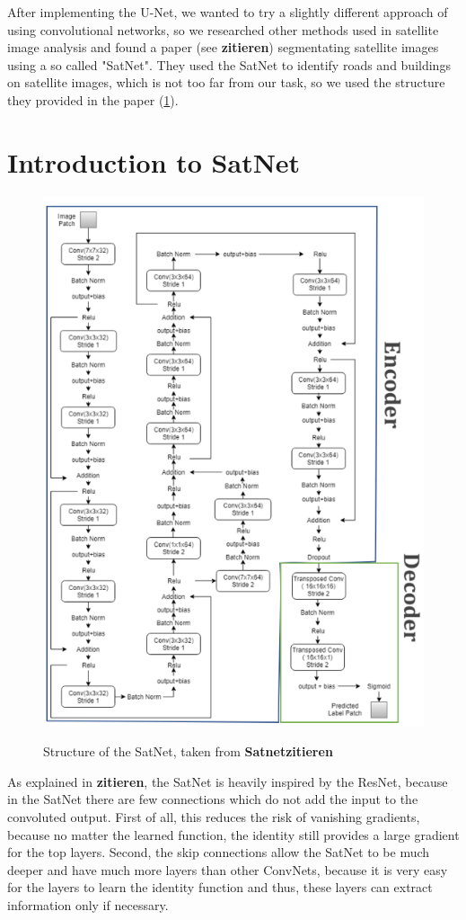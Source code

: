 After implementing the U-Net, we wanted to try a slightly different approach of using convolutional networks, so we researched other methods used in satellite image analysis and found a paper (see \textbf{\color{red} zitieren}) segmentating satellite images using a so called "SatNet". They used the SatNet to identify roads and buildings on satellite images, which is not too far from our task, so we used the structure they provided in the paper (\ref{satnet_structure}). \\

\section{Introduction to SatNet}
\begin{figure}
  \begin{center}
  \label{satnet_structure}
  \includegraphics[width=.7\linewidth]{images/satnet_structure}
  \caption{Structure of the SatNet, taken from \textbf{\color{red} Satnetzitieren}}
  \end{center}
\end{figure}

As explained in \textbf{\color{red}zitieren}, the SatNet is heavily inspired by the ResNet, because in the SatNet there are few connections which do not add the input to the convoluted output. First of all, this reduces the risk of vanishing gradients, because no matter the learned function, the identity still provides a large gradient for the top layers. Second, the skip connections allow the SatNet to be much deeper and have much more layers than other ConvNets, because it is very easy for the layers to learn the identity function and thus, these layers can extract information only if necessary.

